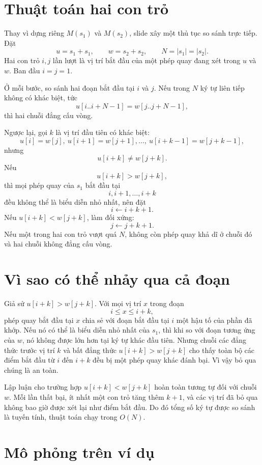\documentclass[11pt]{article}
\begin{document}
\section{Thuật toán hai con trỏ}

Thay vì dựng riêng \(M(s_1)\) và \(M(s_2)\), slide xây một thủ tục so sánh
trực tiếp. Đặt
\[
  u=s_1+s_1,\qquad w=s_2+s_2,\qquad N=|s_1|=|s_2|.
\]
Hai con trỏ \(i,j\) lần lượt là vị trí bắt đầu của một phép quay đang xét
trong \(u\) và \(w\). Ban đầu \(i=j=1\).

Ở mỗi bước, so sánh hai đoạn bắt đầu tại \(i\) và \(j\). Nếu trong \(N\) ký
tự liên tiếp không có khác biệt, tức
\[
  u[i..i+N-1]=w[j..j+N-1],
\]
thì hai chuỗi đẳng cấu vòng.

Ngược lại, gọi \(k\) là vị trí đầu tiên có khác biệt:
\[
  u[i]=w[j],\ u[i+1]=w[j+1],\ldots,\ u[i+k-1]=w[j+k-1],
\]
nhưng
\[
  u[i+k]\ne w[j+k].
\]
Nếu
\[
  u[i+k]>w[j+k],
\]
thì mọi phép quay của \(s_1\) bắt đầu tại
\[
  i,i+1,\ldots,i+k
\]
đều không thể là biểu diễn nhỏ nhất, nên đặt
\[
  i\leftarrow i+k+1.
\]
Nếu \(u[i+k]<w[j+k]\), làm đối xứng:
\[
  j\leftarrow j+k+1.
\]
Nếu một trong hai con trỏ vượt quá \(N\), không còn phép quay khả dĩ ở chuỗi
đó và hai chuỗi không đẳng cấu vòng.

\section{Vì sao có thể nhảy qua cả đoạn}

Giả sử \(u[i+k]>w[j+k]\). Với mọi vị trí \(x\) trong đoạn
\[
  i\le x\le i+k,
\]
phép quay bắt đầu tại \(x\) chia sẻ với đoạn bắt đầu tại \(i\) một hậu tố của
phần đã khớp. Nếu nó có thể là biểu diễn nhỏ nhất của \(s_1\), thì khi so
với đoạn tương ứng của \(w\), nó không được lớn hơn tại ký tự khác đầu tiên.
Nhưng chuỗi các đẳng thức trước vị trí \(k\) và bất đẳng thức
\(u[i+k]>w[j+k]\) cho thấy toàn bộ các điểm bắt đầu từ \(i\) đến \(i+k\) đều
bị một phép quay khác đánh bại. Vì vậy bỏ qua chúng là an toàn.

Lập luận cho trường hợp \(u[i+k]<w[j+k]\) hoàn toàn tương tự đối với chuỗi
\(w\). Mỗi lần thất bại, ít nhất một con trỏ tăng thêm \(k+1\), và các vị trí
đã bỏ qua không bao giờ được xét lại như điểm bắt đầu. Do đó tổng số ký tự
được so sánh là tuyến tính, thuật toán chạy trong \(O(N)\).

\section{Mô phỏng trên ví dụ}
\end{document}
